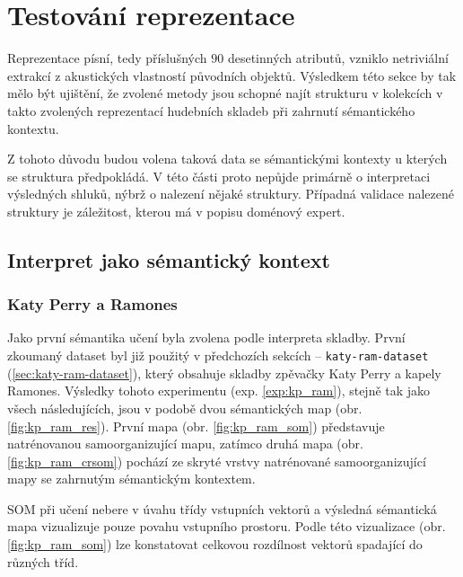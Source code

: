 \documentclass[thesis=M,czech]{FITthesis}[2012/06/26]
\begin{document}
\section{Testování reprezentace}
Reprezentace písní, tedy příslušných $90$ desetinných atributů, vzniklo netriviální extrakcí z akustických vlastností původních objektů. Výsledkem této sekce by tak mělo být ujištění, že zvolené metody jsou schopné najít strukturu v kolekcích v takto zvolených reprezentací hudebních skladeb při zahrnutí sémantického kontextu.


Z tohoto důvodu budou volena taková data se sémantickými kontexty u kterých se struktura předpokládá. V této části proto nepůjde primárně o interpretaci výsledných shluků, nýbrž o nalezení nějaké struktury. Případná validace nalezené struktury je záležitost, kterou má v popisu doménový expert.




\subsection{Interpret jako sémantický kontext}
\subsubsection*{Katy Perry a Ramones}\label{sec:kat_ram}
Jako první sémantika učení byla zvolena podle interpreta skladby. První zkoumaný dataset byl již použitý v předchozích sekcích -- \texttt{katy-ram-dataset} (\ref{sec:katy-ram-dataset}), který obsahuje skladby zpěvačky Katy Perry a kapely Ramones. Výsledky  tohoto experimentu (exp. \ref{exp:kp_ram}), stejně tak jako všech následujících, jsou v podobě dvou sémantických map (obr. \ref{fig:kp_ram_res}). První mapa (obr. \ref{fig:kp_ram_som}) představuje natrénovanou samoorganizující mapu, zatímco druhá mapa (obr. \ref{fig:kp_ram_crsom}) pochází ze skryté vrstvy natrénované samoorganizující mapy se zahrnutým sémantickým kontextem.

	SOM při učení nebere v úvahu třídy vstupních vektorů a výsledná sémantická mapa vizualizuje pouze povahu vstupního prostoru. Podle této vizualizace (obr. \ref{fig:kp_ram_som}) lze konstatovat celkovou rozdílnost vektorů spadající do různých tříd.
	
\end{document}
